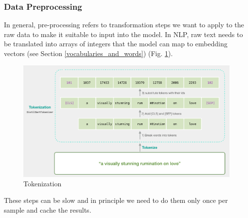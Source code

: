 \subsubsection{Data Preprocessing}
In general, pre-processing refers to transformation steps we want to apply to the raw data to make it suitable to input into the model.
In NLP, raw text needs to be translated into arrays of integers that the model can map to embedding vectors (see Section \ref{vocabularies_and_words}) (Fig. \ref{fig:tokenization}).
\begin{figure}
    \includegraphics[width=\linewidth]{chapters/NLP/figures/tokenization.png}
    \caption{Tokenization}
    \label{fig:tokenization}
\end{figure}
These steps can be slow and in principle we need to do them only once per sample and cache the results.


